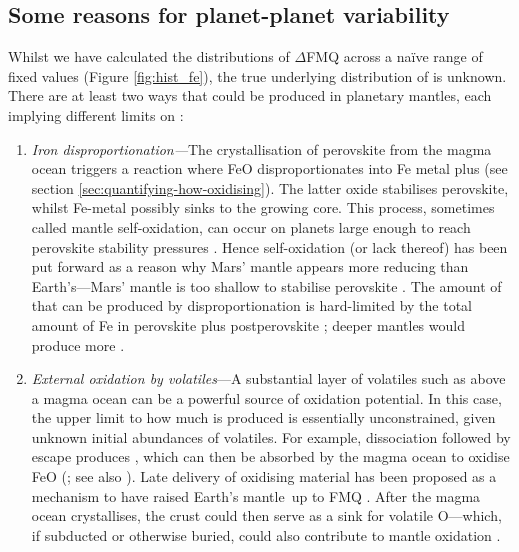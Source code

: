 \subsection{Some reasons for planet-planet \xfer\;variability}
\label{sec:discussion-ferriciron}

Whilst we have calculated the distributions of $\Delta$FMQ across a na\"ive range of fixed \xfer\;values (Figure \ref{fig:hist_fe}), the true underlying distribution of \xfer\;is unknown. There are at least two ways that \ferric\;could be produced in planetary mantles, each implying different limits on \xfer:

\begin{enumerate}
    \item \textit{Iron disproportionation---}The crystallisation of perovskite from the magma ocean triggers a reaction where FeO disproportionates into Fe metal plus  (see section \ref{sec:quantifying-how-oxidising}). The latter oxide stabilises perovskite, whilst Fe-metal possibly sinks to the growing core. This process, sometimes called mantle self-oxidation, can occur on planets large enough to reach perovskite stability pressures \citep[e.g.,][]{wade_core_2005, Wood2006, frost_redox_2008}. Hence self-oxidation (or lack thereof) has been put forward as a reason why Mars' mantle appears more reducing than Earth's---Mars' mantle is too shallow to stabilise perovskite \citep{wade_core_2005}. The amount of \ferric\;that can be produced by disproportionation is hard-limited by the total amount of Fe in perovskite plus  postperovskite \citep{catalli_xray_2010}; deeper mantles would produce more \ferric. 
    \item \textit{External oxidation by volatiles}---A substantial layer of volatiles such as  above a magma ocean can be a powerful source of oxidation potential. In this case, the upper limit to how much \ferric\;is produced is essentially unconstrained, given unknown initial abundances of volatiles. For example,  dissociation followed by  escape produces , which can then be absorbed by the magma ocean to oxidise FeO (\citealt{schaefer_predictions_2016}; see also \citealt{sharp_hydrogenbased_2013}). Late delivery of oxidising material has been proposed as a mechanism to have raised Earth's mantle \fo\,up to FMQ \citep{oneill_origin_1991}. After the magma ocean crystallises, the crust could then serve as a sink for volatile O---which, if subducted or otherwise buried, could also contribute to mantle oxidation \citep[e.g.,][]{krissansen-totton_oxygen_2021}.
\end{enumerate}


